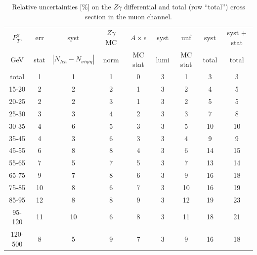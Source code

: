 \begin{table}[h]
  \scriptsize
  \begin{center}
  \caption{Relative uncertainties [\%] on the $Z\gamma$ differential and total (row ``total'') cross section in the muon channel.}
  \begin{tabular}{|c|c|c|c|c|c|c|c|c|}
    $P_T^{\gamma}$,  & err & syst & $Z\gamma$ MC & $A \times \epsilon$ & syst & unf & syst & syst + stat\\
    GeV  & stat & $|N_{Ich}-N_{\sigma{i\eta i\eta}}|$ & norm & MC stat & lumi & MC stat & total & total\\ \hline
    total  & 1 & 1 & 1 & 0 & 3 & 1 & 3 & 3 \\ \hline
    15-20 & 2 & 2 & 2 & 1 & 3 & 2 & 4 & 5 \\ \hline
    20-25 & 2 & 2 & 3 & 1 & 3 & 2 & 5 & 5 \\ \hline
    25-30 & 3 & 3 & 4 & 2 & 3 & 3 & 7 & 8 \\ \hline
    30-35 & 4 & 6 & 5 & 3 & 3 & 5 & 10 & 10 \\ \hline
    35-45 & 4 & 3 & 6 & 3 & 3 & 4 & 9 & 9 \\ \hline
    45-55 & 6 & 8 & 8 & 4 & 3 & 6 & 14 & 15 \\ \hline
    55-65 & 7 & 5 & 7 & 5 & 3 & 7 & 13 & 14 \\ \hline
    65-75 & 9 & 7 & 8 & 6 & 3 & 9 & 16 & 18 \\ \hline
    75-85 & 10 & 8 & 6 & 7 & 3 & 10 & 16 & 19 \\ \hline
    85-95 & 12 & 8 & 8 & 9 & 3 & 12 & 19 & 23 \\ \hline
    95-120 & 11 & 10 & 6 & 8 & 3 & 11 & 18 & 21 \\ \hline
    120-500 & 8 & 5 & 9 & 7 & 3 & 9 & 16 & 18 \\ \hline
  \end{tabular}
  \label{tab:systInPercent_MUON_ZGamma}
  \end{center}
\end{table}

